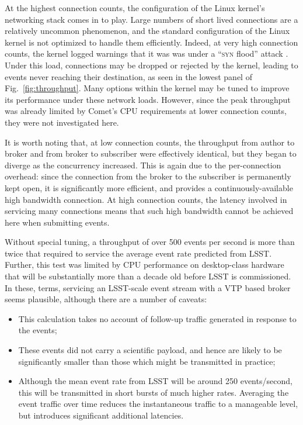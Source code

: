 \documentclass[5p,authoryear]{elsarticle}
\begin{document}
At the highest connection counts, the configuration of the Linux kernel's
networking stack comes in to play. Large numbers of short lived connections
are a relatively uncommon phenomenon, and the standard configuration of the
Linux kernel is not optimized to handle them efficiently. Indeed, at very high
connection counts, the kernel logged warnings that it was was under a
``\textsc{syn} flood'' attack \citep{CERT:1996}. Under this load, connections
may be dropped or rejected by the kernel, leading to events never reaching
their destination, as seen in the lowest panel of Fig.~\ref{fig:throughput}.
Many options within the kernel may be tuned to improve its performance under
these network loads. However, since the peak throughput was already limited by
Comet's CPU requirements at lower connection counts, they were not
investigated here.

It is worth noting that, at low connection counts, the throughput from author
to broker and from broker to subscriber were effectively identical, but they
began to diverge as the concurrency increased. This is again due to the
per-connection overhead: since the connection from the broker to the
subscriber is permanently kept open, it is significantly more efficient, and
provides a continuously-available high bandwidth connection. At high
connection counts, the latency involved in servicing many connections means
that such high bandwidth cannot be achieved here when submitting events.

Without special tuning, a throughput of over 500 events per second is more
than twice that required to service the average event rate predicted from
LSST\@. Further, this test was limited by CPU performance on desktop-class
hardware that will be substantially more than a decade old before LSST is
commissioned. In these, terms, servicing an LSST-scale event stream with a VTP
based broker seems plausible, although there are a number of caveats:

\begin{itemize}

  \item{This calculation takes no account of follow-up traffic generated in
  response to the events;}

  \item{These events did not carry a scientific payload, and hence are likely
  to be significantly smaller than those which might be transmitted in
  practice;}

  \item{Although the mean event rate from LSST will be around 250
  events/second, this will be transmitted in short bursts of much higher
  rates. Averaging the event traffic over time reduces the instantaneous
  traffic to a manageable level, but introduces significant additional
  latencies.}

\end{itemize}
\end{document}
